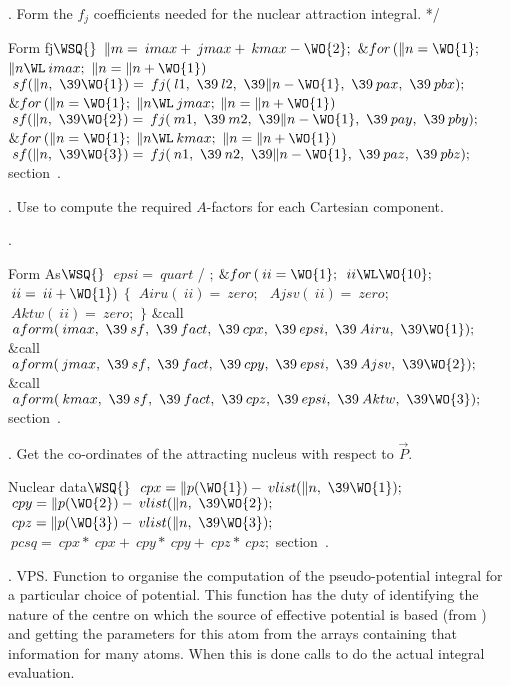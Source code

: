 .  Form the $f_j$ coefficients needed for the nuclear attraction integral.
*/


\WY\WP\4\4Form fj\X \X${}\WSQ{}$\6
$\|m=\>{imax}+\>{jmax}+\>{kmax}-\WO{2};$\6
$\&{for}\,(\|n=\WO{1};$ $\|n\WL\>{imax};$ $\|n=\|n+\WO{1})$ \1\6
$\>{sf}(\|n,\ \39\WO{1})=\>{fj}(\>{l1},\ \39\>{l2},\ \39\|n-\WO{1},\ \39%
\>{pax},\ \39\>{pbx});$\2\6
$\&{for}\,(\|n=\WO{1};$ $\|n\WL\>{jmax};$ $\|n=\|n+\WO{1})$ \1\6
$\>{sf}(\|n,\ \39\WO{2})=\>{fj}(\>{m1},\ \39\>{m2},\ \39\|n-\WO{1},\ \39%
\>{pay},\ \39\>{pby});$\2\6
$\&{for}\,(\|n=\WO{1};$ $\|n\WL\>{kmax};$ $\|n=\|n+\WO{1})$ \1\6
$\>{sf}(\|n,\ \39\WO{3})=\>{fj}(\>{n1},\ \39\>{n2},\ \39\|n-\WO{1},\ \39%
\>{paz},\ \39\>{pbz});$\2\WY\Wendc
\WU section~.
\fi %

.  Use  to compute the required $A$-factors for each
Cartesian component.

\fi %

.

\WY\WP\4\4Form As\X \X${}\WSQ{}$\6
$\>{epsi}=\>{quart}$ {/} ;\6
$\&{for}\,(\>{ii}=\WO{1};$ $\>{ii}\WL\WO{10};$ $\>{ii}=\>{ii}+\WO{1})$ \1\7
$\{$\6
$\>{Airu}(\>{ii})=\>{zero};$\ $\>{Ajsv}(\>{ii})=\>{zero};$\ $\>{Aktw}(\>{ii})=%
\>{zero};$\6
$\}$\2\7
\&{call} $\>{aform}(\>{imax},\ \39\>{sf},\ \39\>{fact},\ \39\>{cpx},\ \39%
\>{epsi},\ \39\>{Airu},\ \39\WO{1});$\5
\6
\&{call} $\>{aform}(\>{jmax},\ \39\>{sf},\ \39\>{fact},\ \39\>{cpy},\ \39%
\>{epsi},\ \39\>{Ajsv},\ \39\WO{2});$\5
\6
\&{call} $\>{aform}(\>{kmax},\ \39\>{sf},\ \39\>{fact},\ \39\>{cpz},\ \39%
\>{epsi},\ \39\>{Aktw},\ \39\WO{3});$\5
\WY\Wendc
\WU section~.
\fi %

.  Get the co-ordinates of the attracting nucleus with respect to $%
\vec{P}$.


\WY\WP\4\4Nuclear data\X \X${}\WSQ{}$\6
$\>{cpx}=\|p(\WO{1})-\>{vlist}(\|n,\ \39\WO{1});$\ $\>{cpy}=\|p(\WO{2})-%
\>{vlist}(\|n,\ \39\WO{2});$\6
$\>{cpz}=\|p(\WO{3})-\>{vlist}(\|n,\ \39\WO{3});$\ $\>{pcsq}=\>{cpx}\ast%
\>{cpx}+\>{cpy}\ast\>{cpy}+\>{cpz}\ast\>{cpz};$\WY\Wendc
\WU section~.
\fi %

.  VPS. Function to organise the computation of the pseudo-potential
integral for a particular choice of potential. This function has the duty
of identifying the nature of the centre on which the source of
effective potential is based (from ) and getting the parameters
for this atom from the arrays containing that information for many atoms.
When this is done  calls  to do the actual
integral
evaluation.

